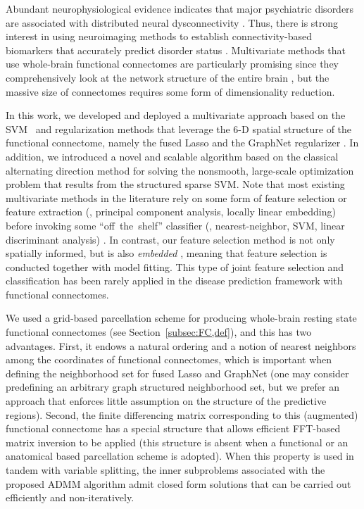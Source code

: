 Abundant neurophysiological evidence indicates that major psychiatric disorders are associated with distributed neural dysconnectivity \citep{Stephan:2006,Konrad:2010,Muller:2011}.
Thus, there is strong interest in using neuroimaging methods to establish connectivity-based biomarkers that accurately predict disorder status \citep{Kloppel:2012,Sundermann:2013,Cohen:2011}.
Multivariate methods that use whole-brain functional connectomes are particularly promising since they comprehensively look at the network structure of the entire brain \citep{Castellanos:2013,Fornito:2012}, but the massive size of connectomes requires some form of dimensionality reduction. 

In this work, we developed and deployed a multivariate approach based on the SVM~\citep{Cortes:1995} and regularization methods that leverage the 6-D spatial structure of the functional connectome, namely the fused Lasso \citep{Tibshirani:2005} and the GraphNet regularizer \citep{Grosenick:2013}.
In addition, we introduced a novel and scalable algorithm based on the classical alternating direction method \citep{Boyd:2011,Gabay:1976,Glowinski:1975} for solving the nonsmooth, large-scale optimization problem that results from the structured sparse SVM.
Note that most existing multivariate methods in the literature rely on some form of \apriori feature selection or feature extraction (\eg, principal component analysis, locally linear embedding) before invoking some \mbox{``off the shelf''} classifier (\eg, nearest-neighbor, SVM, linear discriminant analysis) \citep{Castellanos:2013}.
In contrast, our feature selection method is not only spatially informed, but is also \emph{embedded} \citep{Guyon:2003}, meaning that feature selection is conducted together with model fitting.
This type of joint feature selection and classification has been rarely applied in the disease prediction framework with functional connectomes.

We used a grid-based parcellation scheme for producing whole-brain resting state functional connectomes (see Section~\ref{subsec:FC,def}), and this has two advantages.
First, it endows a natural ordering and a notion of nearest neighbors among the coordinates of functional connectomes, which is important when defining the neighborhood set for fused Lasso and GraphNet (one may consider predefining an arbitrary graph structured neighborhood set, but we prefer an approach that enforces little \apriori assumption on the structure of the predictive regions).
Second, the finite differencing matrix corresponding to this (augmented) functional connectome has a special structure that allows efficient FFT-based matrix inversion to be applied (this structure is absent when a functional or an anatomical based parcellation scheme is adopted).  When this property is used in tandem with variable splitting, the inner subproblems associated with the proposed ADMM algorithm admit closed form solutions that can be carried out efficiently and non-iteratively.

